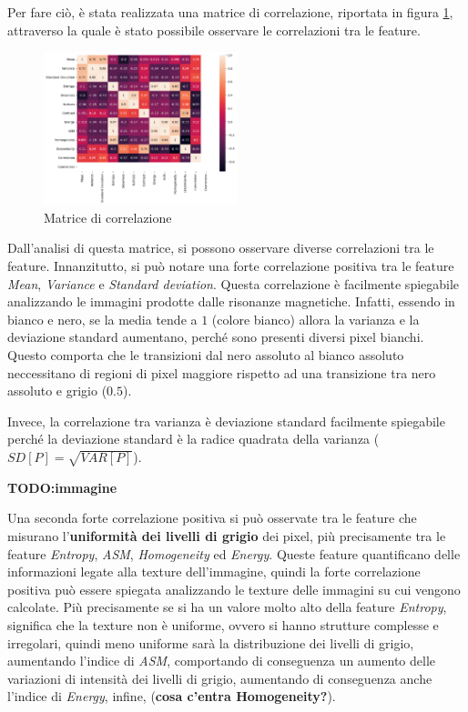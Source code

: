 Per fare ciò, è stata realizzata una matrice di correlazione, riportata in figura
\ref{fig:corr-matrix}, attraverso la quale è stato possibile osservare le correlazioni
tra le feature.

\begin{figure}[!ht]
    \centering
    \includegraphics[width=0.5\textwidth]{img/analisi/corr.png}
    \caption{Matrice di correlazione}
    \label{fig:corr-matrix}
\end{figure}

Dall'analisi di questa matrice, si possono osservare diverse correlazioni tra le
feature. Innanzitutto, si può notare una forte correlazione positiva tra le feature
\textit{Mean}, \textit{Variance} e \textit{Standard deviation}. Questa correlazione
è facilmente spiegabile analizzando le immagini prodotte dalle risonanze magnetiche.
Infatti, essendo in bianco e nero, se la media tende a $1$ (colore bianco) allora
la varianza e la deviazione standard aumentano, perché sono presenti diversi 
pixel bianchi. Questo comporta che le transizioni dal nero assoluto al bianco
assoluto neccessitano di regioni di pixel maggiore rispetto ad una transizione
tra nero assoluto e grigio ($0.5$).

Invece, la correlazione tra varianza è deviazione standard facilmente spiegabile
perché la deviazione standard è la radice quadrata della varianza ($SD[P] = \sqrt{VAR[P]}$).

\textbf{TODO:immagine}

Una seconda forte correlazione positiva si può osservate tra le feature che 
misurano l'\textbf{uniformità dei livelli di grigio} dei pixel, più precisamente 
tra le feature \textit{Entropy}, \textit{ASM}, \textit{Homogeneity} ed 
\textit{Energy}. Queste feature quantificano delle informazioni legate alla
texture dell'immagine, quindi la forte correlazione positiva può essere spiegata 
analizzando le texture delle immagini su cui vengono calcolate. Più precisamente
se si ha un valore molto alto della feature \textit{Entropy}, significa che la
texture non è uniforme, ovvero si hanno strutture complesse e irregolari, quindi
meno uniforme sarà la distribuzione dei livelli di grigio, aumentando l'indice
di \textit{ASM}, comportando di conseguenza un aumento delle variazioni di intensità
dei livelli di grigio, aumentando di conseguenza anche l'indice di \textit{Energy},
infine, (\textbf{cosa c'entra Homogeneity?}).

